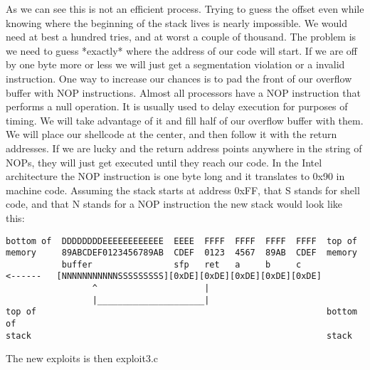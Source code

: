 \documentclass[12pt]{article}
\begin{document}
As we can see this is not an efficient process. Trying to guess the offset even while knowing where the 
beginning of the stack lives is nearly impossible. We would need at best a hundred tries, and at worst a couple 
of thousand. The problem is we need to guess *exactly* where the address of our code will start. If we are off 
by one byte more or less we will just get a segmentation violation or a invalid instruction. One way to increase 
our chances is to pad the front of our overflow buffer with NOP instructions. Almost all processors have a NOP 
instruction that performs a null operation. It is usually used to delay execution for purposes of timing. We will 
take advantage of it and fill half of our overflow buffer with them. We will place our shellcode at the center, 
and then follow it with the return addresses. If we are lucky and the return address points anywhere in the string 
of NOPs, they will just get executed until they reach our code. In the Intel architecture the NOP instruction is 
one byte long and it translates to 0x90 in machine code. Assuming the stack starts at address 0xFF, that S stands 
for shell code,  and that N stands for a NOP instruction the new stack would look like this: 

{\footnotesize
\begin{verbatim}
bottom of  DDDDDDDDEEEEEEEEEEEE  EEEE  FFFF  FFFF  FFFF  FFFF  top of
memory     89ABCDEF0123456789AB  CDEF  0123  4567  89AB  CDEF  memory
           buffer                sfp   ret   a     b     c
<------   [NNNNNNNNNNNSSSSSSSSS][0xDE][0xDE][0xDE][0xDE][0xDE]
                 ^                     |
                 |_____________________|
top of                                                         bottom of
stack                                                          stack
\end{verbatim}
}


The new exploits is then exploit3.c 
\end{document}
